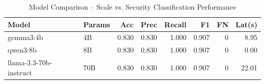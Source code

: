 \begin{table}[ht]
\centering
\caption{Model Comparison -- Scale vs. Security Classification Performance}
\label{tab:e2_model_comparison}
\begin{tabular}{llrrrrrr}
\toprule
Model & Params & Acc & Prec & Recall & F1 & FN & Lat(s) \\
\midrule
gemma3:4b & 4B & 0.830 & 0.830 & 1.000 & 0.907 & 0 & 8.95 \\
qwen3:8b & 8B & 0.830 & 0.830 & 1.000 & 0.907 & 0 & 0.00 \\
llama-3.3-70b-instruct & 70B & 0.830 & 0.830 & 1.000 & 0.907 & 0 & 22.01 \\
\bottomrule
\end{tabular}
\end{table}